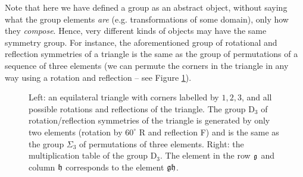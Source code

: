 Note that here we have defined a group as an abstract object, without saying what the group elements \emph{are} (e.g. transformations of some domain), only how they \emph{compose}.
Hence, very different kinds of objects may have the same symmetry group.
For instance, the aforementioned group of rotational and reflection symmetries of a triangle is the same as the group of permutations of a sequence of three elements (we can permute the corners in the triangle in any way using a rotation and reflection -- see Figure \ref{fig:group-example-d3-s3}).

\begin{figure}
    \centering
{}
    \hspace{2mm}
    \caption{Left: an equilateral triangle with corners labelled by $1, 2, 3$, and all possible rotations and reflections of the triangle. The group $\mathrm{D}_3$ of rotation/reflection symmetries of the triangle is generated by only two elements (rotation by $60^\circ$ R and reflection F) and is the same as the group $\Sigma_3$ of permutations of three elements. 
    Right: the multiplication table of the group $\mathrm{D}_3$. The element in the row ${\mathfrak{g}}$ and column ${\mathfrak{h}}$ corresponds to the element ${\mathfrak{g}} {\mathfrak{h}}$. %
    \label{fig:group-example-d3-s3}
    }
\end{figure}

